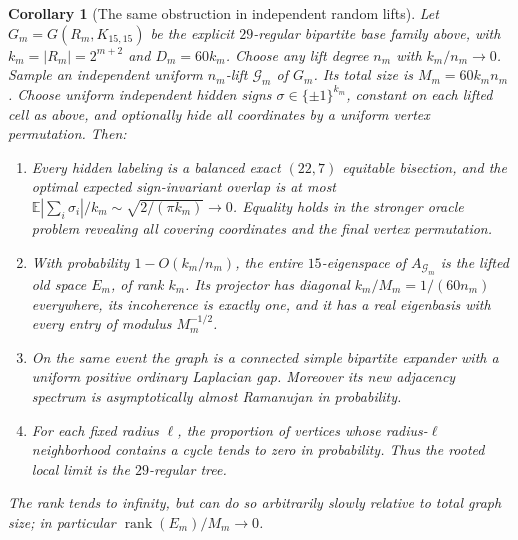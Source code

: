 \documentclass[11pt]{article}
\newtheorem{corollary}{Corollary}
\newcommand{\E}{\mathbb E}
\begin{document}
\begin{corollary}[The same obstruction in independent random lifts]
Let $G_m=G(R_m,K_{15,15})$ be the explicit $29$-regular bipartite base
family above, with $k_m=|R_m|=2^{m+2}$ and $D_m=60k_m$. Choose any lift
degree $n_m$ with $k_m/n_m\to0$. Sample an independent uniform $n_m$-lift
$\mathcal G_m$ of $G_m$. Its total size is $M_m=60k_m n_m$.
Choose uniform independent hidden signs $\sigma\in\{\pm1\}^{k_m}$,
constant on each lifted cell as above, and optionally hide all coordinates
by a uniform vertex permutation. Then:
\begin{enumerate}
\item Every hidden labeling is a balanced exact $(22,7)$ equitable
      bisection, and the optimal expected sign-invariant overlap is at most
      $\E|\sum_i\sigma_i|/k_m\sim\sqrt{2/(\pi k_m)}\to0$.
      Equality holds in the stronger oracle problem revealing all covering
      coordinates and the final vertex permutation.
\item With probability $1-O(k_m/n_m)$, the \emph{entire} $15$-eigenspace
      of $A_{\mathcal G_m}$ is the lifted old space $E_m$, of rank $k_m$.
      Its projector has diagonal $k_m/M_m=1/(60n_m)$ everywhere, its
      incoherence is exactly one, and it has a real eigenbasis with every
      entry of modulus $M_m^{-1/2}$.
\item On the same event the graph is a connected simple bipartite expander
      with a uniform positive ordinary Laplacian gap. Moreover its new
      adjacency spectrum is asymptotically almost Ramanujan in probability.
\item For each fixed radius $\ell$, the proportion of vertices whose
      radius-$\ell$ neighborhood contains a cycle tends to zero in
      probability. Thus the rooted local limit is the $29$-regular tree.
\end{enumerate}
The rank tends to infinity, but can do so arbitrarily slowly relative to
total graph size; in particular $\operatorname{rank}(E_m)/M_m\to0$.
\end{corollary}
\end{document}
